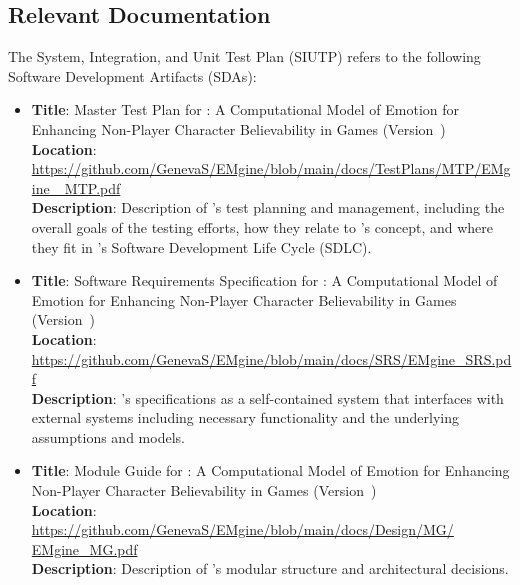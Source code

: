\subsection{Relevant Documentation}
The System, Integration, and Unit Test Plan (SIUTP) refers to the following
Software Development Artifacts (SDAs):
\begin{itemize}

    \item \textbf{Title}: Master Test Plan for \progname{}:
    A Computational Model of Emotion for Enhancing Non-Player Character
    Believability in Games (Version~\mastertestplanVersion) \\
    \textbf{Location}:
    \href{https://github.com/GenevaS/EMgine/blob/main/docs/TestPlans/MTP/EMgine_MTP.pdf}{
        https://github.com/GenevaS/EMgine/blob/main/docs/TestPlans/MTP/EMgine
        \_MTP.pdf} \\
    \textbf{Description}: Description of \progname{}'s test planning and
    management, including the overall goals of the testing efforts, how they
    relate to \progname{}'s concept, and where they fit in \progname{}'s
    Software Development Life Cycle (SDLC).

    \item \textbf{Title}: Software Requirements Specification for \progname{}:
    A Computational Model of Emotion for Enhancing Non-Player Character
    Believability in Games (Version~\srsVersion) \\
    \textbf{Location}:
    \href{https://github.com/GenevaS/EMgine/blob/main/docs/SRS/EMgine_SRS.pdf}{https://github.com/GenevaS/EMgine/blob/main/docs/SRS/EMgine\_SRS.pdf}
     \\
    \textbf{Description}: \progname{}'s specifications as a self-contained
    system that interfaces with external systems including necessary
    functionality and the underlying assumptions and models.

    \item \textbf{Title}: Module Guide for \progname{}: A Computational Model
    of Emotion for Enhancing Non-Player Character Believability in Games
    (Version~\mgversion) \\
    \textbf{Location}:
    \href{https://github.com/GenevaS/EMgine/blob/main/docs/Design/MG/EMgine_MG.pdf}{https://github.com/GenevaS/EMgine/blob/main/docs/Design/MG/
        \newline EMgine\_MG.pdf} \\
    \textbf{Description}: Description of \progname{}'s modular structure and
    architectural decisions.


\end{itemize}

